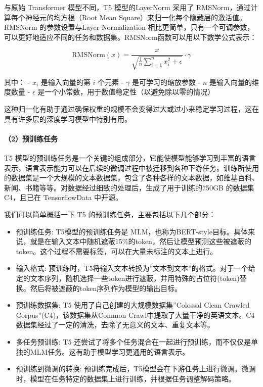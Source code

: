 \documentclass[12pt,a4paper]{book}
\begin{document}
与原始 Transformer 模型不同，T5 模型的LayerNorm 采用了
RMSNorm，通过计算每个神经元的均方根（Root Mean
Square）来归一化每个隐藏层的激活值。RMSNorm 的参数设置与Layer
Normalization
相比更简单，只有一个可调参数，可以更好地适应不同的任务和数据集。RMSNorm函数可以用以下数学公式表示：

\[
\text{RMSNorm}(x) = \frac{x}{\sqrt{\frac{1}{n}\sum_{i=1}^{n}x_i^2 + \epsilon}} \cdot \gamma
\]

其中： - \(x_i\) 是输入向量的第 \(i\) 个元素 - \(\gamma\)
是可学习的缩放参数 - \(n\) 是输入向量的维度数量 - \(\epsilon\)
是一个小常数，用于数值稳定性（以避免除以零的情况）

这种归一化有助于通过确保权重的规模不会变得过大或过小来稳定学习过程，这在具有许多层的深度学习模型中特别有用。

\paragraph{（2）预训练任务}\label{ux9884ux8badux7ec3ux4efbux52a1}

T5
模型的预训练任务是一个关键的组成部分，它能使模型能够学习到丰富的语言表示，语言表示能力可以在后续的微调过程中被迁移到各种下游任务。训练所使用的数据集是一个大规模的文本数据集，包含了各种各样的文本数据，如维基百科、新闻、书籍等等。对数据经过细致的处理后，生成了用于训练的750GB
的数据集 C4，且已在 TensorflowData 中开源。

我们可以简单概括一下 T5 的预训练任务，主要包括以下几个部分：

\begin{itemize}
\tightlist
\item
  预训练任务: T5模型的预训练任务是
  MLM，也称为BERT-style目标。具体来说，就是在输入文本中随机遮蔽15\%的token，然后让模型预测这些被遮蔽的token。这个过程不需要标签，可以在大量未标注的文本上进行。
\item
  输入格式:
  预训练时，T5将输入文本转换为''文本到文本''的格式。对于一个给定的文本序列，随机选择一些token进行遮蔽，并用特殊的占位符(token)替换。然后将被遮蔽的token序列作为模型的输出目标。
\item
  预训练数据集: T5 使用了自己创建的大规模数据集''Colossal Clean Crawled
  Corpus''(C4)，该数据集从Common
  Crawl中提取了大量干净的英语文本。C4数据集经过了一定的清洗，去除了无意义的文本、重复文本等。
\item
  多任务预训练: T5
  还尝试了将多个任务混合在一起进行预训练，而不仅仅是单独的MLM任务。这有助于模型学习更通用的语言表示。
\item
  预训练到微调的转换:
  预训练完成后，T5模型会在下游任务上进行微调。微调时，模型在任务特定的数据集上进行训练，并根据任务调整解码策略。
\end{itemize}
\end{document}
